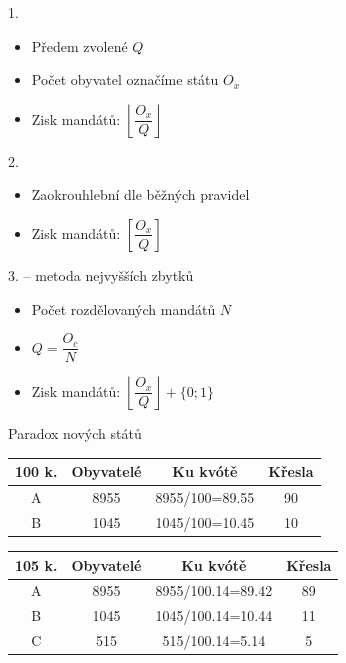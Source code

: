 \documentclass[17pt]{beamer}
\begin{document}
\begin{frame}{1.}
\begin{itemize}
\item Předem zvolené $Q$
\item Počet obyvatel označíme státu $O_{x}$
\item Zisk mandátů: $\left\lfloor\dfrac{O_{x}}{Q}\right\rfloor$
\end{itemize}
\end{frame}

\begin{frame}{2.}
\begin{itemize}
\item Zaokrouhlební dle běžných pravidel
\item Zisk mandátů: $\left[\dfrac{O_{x}}{Q}\right]$
\end{itemize}
\end{frame}

\begin{frame}{3. -- metoda nejvyšších zbytků}
\begin{itemize}
\item Počet rozdělovaných mandátů $N$
\item $Q=\dfrac{O_{c}}{N}$
\item Zisk mandátů: $\left\lfloor\dfrac{O_{x}}{Q}\right\rfloor+\{0;1\}$
\end{itemize}
\end{frame}

\begin{frame}{Paradox nových států}
\begin{center}
\begin{tabular}{|c|c|c|c|}
\hline 
100 k. & Obyvatelé & Ku kvótě & Křesla \\ 
\hline 
A & 8955 & \hspace{0.35cm}8955/100=89.55\hspace{0.35cm} & 90 \\ 
\hline 
B & 1045 & 1045/100=10.45 & 10 \\ 
\hline 
\end{tabular}
\end{center} 
\begin{center}
\begin{tabular}{|c|c|c|c|}
\hline 
105 k. & Obyvatelé & Ku kvótě & Křesla \\ 
\hline 
A & 8955 & 8955/100.14=89.42 & 89 \\ 
\hline 
B & 1045 & 1045/100.14=10.44 & 11 \\ 
\hline 
C & 515 & 515/100.14=5.14 & 5 \\ 
\hline 
\end{tabular} 
\end{center}
\end{frame}
\end{document}
